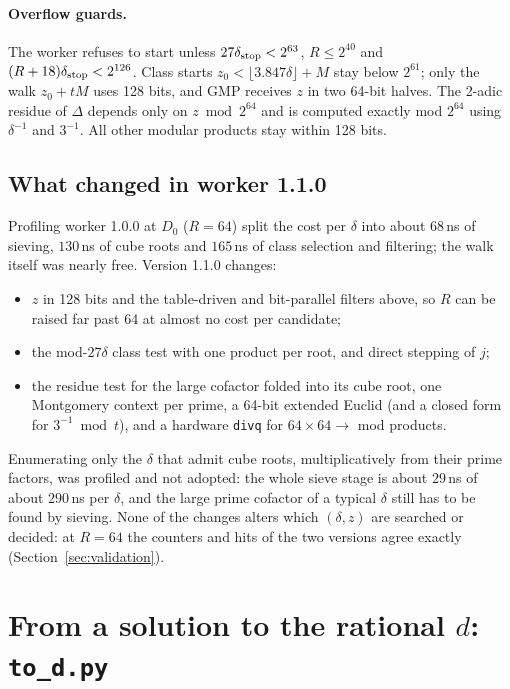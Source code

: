 \documentclass[11pt,a4paper]{article}
\theoremstyle{remark}
\begin{document}
\paragraph{Overflow guards.} The worker refuses to start unless $27\delta_{\rm stop}<2^{63}$,
$R\le2^{40}$ and $(R+18)\delta_{\rm stop}<2^{126}$. Class starts $z_0<\lfloor3.847\delta\rfloor+M$
stay below $2^{61}$; only the walk $z_0+tM$ uses 128 bits, and GMP receives $z$ in two 64-bit
halves. The 2-adic residue of $\Delta$ depends only on $z\bmod2^{64}$ and is computed exactly
mod $2^{64}$ using $\delta^{-1}$ and $3^{-1}$. All other modular products stay within 128 bits.

\subsection{What changed in worker 1.1.0}\label{sec:v11}
Profiling worker 1.0.0 at $D_0$ ($R=64$) split the cost per $\delta$ into about $68$\,ns of
sieving, $130$\,ns of cube roots and $165$\,ns of class selection and filtering; the walk itself
was nearly free. Version 1.1.0 changes:
\begin{itemize}[leftmargin=*]
  \item $z$ in 128 bits and the table-driven and bit-parallel filters above, so $R$ can be raised
  far past 64 at almost no cost per candidate;
  \item the mod-$27\delta$ class test with one product per root, and direct stepping of $j$;
  \item the residue test for the large cofactor folded into its cube root, one Montgomery
  context per prime, a 64-bit extended Euclid (and a closed form for $3^{-1}\bmod t$), and a
  hardware \texttt{divq} for $64\times64\to$ mod products.
\end{itemize}
Enumerating only the $\delta$ that admit cube roots, multiplicatively from their prime factors,
was profiled and not adopted: the whole sieve stage is about $29$\,ns of about $290$\,ns per
$\delta$, and the large prime cofactor of a typical $\delta$ still has to be found by sieving.
None of the changes alters which $(\delta,z)$ are searched or decided: at $R=64$ the counters
and hits of the two versions agree exactly (Section~\ref{sec:validation}).

\section{From a solution to the rational \texorpdfstring{$d$}{d}: \texttt{to\_d.py}}
\end{document}
